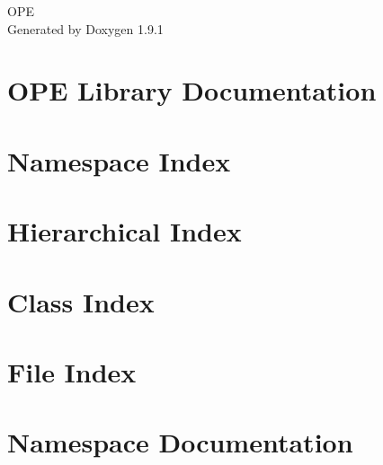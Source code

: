 \let\mypdfximage\pdfximage\def\pdfximage{\immediate\mypdfximage}\documentclass[twoside]{book}
\newcommand{\+}{\discretionary{\mbox{\scriptsize$\hookleftarrow$}}{}{}}
\newcommand{\clearemptydoublepage}{%
  \newpage{\pagestyle{empty}\cleardoublepage}%
}
\begin{document}
\raggedbottom

\hypersetup{pageanchor=false,
             bookmarksnumbered=true,
             pdfencoding=unicode
            }
\begin{titlepage}
\vspace*{7cm}
\begin{center}%
{\Large OPE }\\
\vspace*{1cm}
{\large Generated by Doxygen 1.9.1}\\
\end{center}
\end{titlepage}
\clearemptydoublepage
{}
\tableofcontents
\clearemptydoublepage
{}
\hypersetup{pageanchor=true}

\chapter{OPE Library Documentation}
\label{index}\hypertarget{index}{}
\chapter{Namespace Index}

\chapter{Hierarchical Index}

\chapter{Class Index}

\chapter{File Index}

\chapter{Namespace Documentation}







\end{document}
